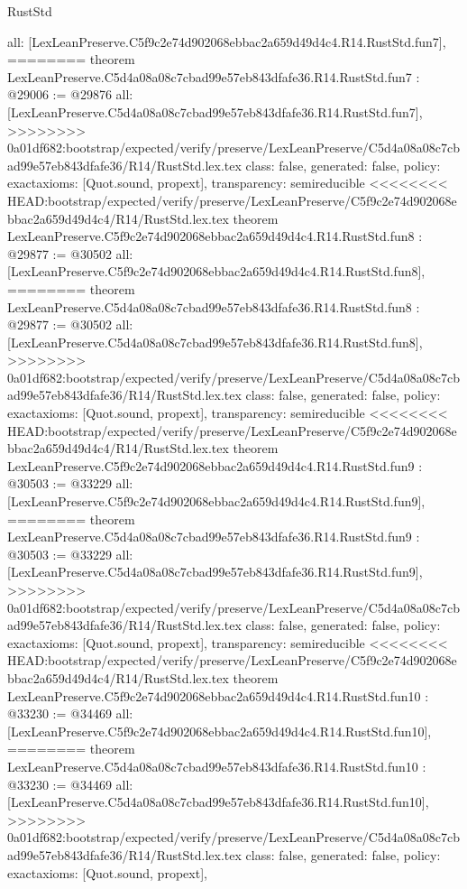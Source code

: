 \begin{lexlean}{RustStd}
\begin{coremodule}
{\begin{coremodule}
{{{{{{{{{{  all: [LexLeanPreserve.C5f9c2e74d902068ebbac2a659d49d4c4.R14.RustStd.fun7],
========
theorem LexLeanPreserve.C5d4a08a08c7cbad99e57eb843dfafe36.R14.RustStd.fun7 : @29006 := @29876 {
  all: [LexLeanPreserve.C5d4a08a08c7cbad99e57eb843dfafe36.R14.RustStd.fun7],
>>>>>>>> 0a01df682:bootstrap/expected/verify/preserve/LexLeanPreserve/C5d4a08a08c7cbad99e57eb843dfafe36/R14/RustStd.lex.tex
  class: false,
  generated: false,
  policy: exact{axioms: [Quot.sound, propext]},
  transparency: semireducible
}
<<<<<<<< HEAD:bootstrap/expected/verify/preserve/LexLeanPreserve/C5f9c2e74d902068ebbac2a659d49d4c4/R14/RustStd.lex.tex
theorem LexLeanPreserve.C5f9c2e74d902068ebbac2a659d49d4c4.R14.RustStd.fun8 : @29877 := @30502 {
  all: [LexLeanPreserve.C5f9c2e74d902068ebbac2a659d49d4c4.R14.RustStd.fun8],
========
theorem LexLeanPreserve.C5d4a08a08c7cbad99e57eb843dfafe36.R14.RustStd.fun8 : @29877 := @30502 {
  all: [LexLeanPreserve.C5d4a08a08c7cbad99e57eb843dfafe36.R14.RustStd.fun8],
>>>>>>>> 0a01df682:bootstrap/expected/verify/preserve/LexLeanPreserve/C5d4a08a08c7cbad99e57eb843dfafe36/R14/RustStd.lex.tex
  class: false,
  generated: false,
  policy: exact{axioms: [Quot.sound, propext]},
  transparency: semireducible
}
<<<<<<<< HEAD:bootstrap/expected/verify/preserve/LexLeanPreserve/C5f9c2e74d902068ebbac2a659d49d4c4/R14/RustStd.lex.tex
theorem LexLeanPreserve.C5f9c2e74d902068ebbac2a659d49d4c4.R14.RustStd.fun9 : @30503 := @33229 {
  all: [LexLeanPreserve.C5f9c2e74d902068ebbac2a659d49d4c4.R14.RustStd.fun9],
========
theorem LexLeanPreserve.C5d4a08a08c7cbad99e57eb843dfafe36.R14.RustStd.fun9 : @30503 := @33229 {
  all: [LexLeanPreserve.C5d4a08a08c7cbad99e57eb843dfafe36.R14.RustStd.fun9],
>>>>>>>> 0a01df682:bootstrap/expected/verify/preserve/LexLeanPreserve/C5d4a08a08c7cbad99e57eb843dfafe36/R14/RustStd.lex.tex
  class: false,
  generated: false,
  policy: exact{axioms: [Quot.sound, propext]},
  transparency: semireducible
}
<<<<<<<< HEAD:bootstrap/expected/verify/preserve/LexLeanPreserve/C5f9c2e74d902068ebbac2a659d49d4c4/R14/RustStd.lex.tex
theorem LexLeanPreserve.C5f9c2e74d902068ebbac2a659d49d4c4.R14.RustStd.fun10 : @33230 := @34469 {
  all: [LexLeanPreserve.C5f9c2e74d902068ebbac2a659d49d4c4.R14.RustStd.fun10],
========
theorem LexLeanPreserve.C5d4a08a08c7cbad99e57eb843dfafe36.R14.RustStd.fun10 : @33230 := @34469 {
  all: [LexLeanPreserve.C5d4a08a08c7cbad99e57eb843dfafe36.R14.RustStd.fun10],
>>>>>>>> 0a01df682:bootstrap/expected/verify/preserve/LexLeanPreserve/C5d4a08a08c7cbad99e57eb843dfafe36/R14/RustStd.lex.tex
  class: false,
  generated: false,
  policy: exact{axioms: [Quot.sound, propext]},
}}}}}}}}}}}}}}
\end{coremodule}}
\end{coremodule}
\end{lexlean}
